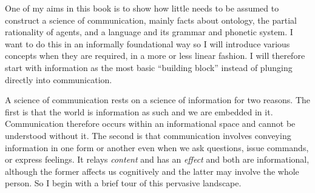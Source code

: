 One of my aims in this book is to show how little needs to be assumed to construct a science of communication, mainly facts about ontology, the partial rationality of agents, and a language and its grammar and phonetic system. I want to do this in an informally foundational way so I will introduce various concepts when they are required, in a more or less linear fashion. I will therefore start with information as the most basic ``building block'' instead of plunging directly into communication. 

A science of communication rests on a science of information for two reasons. The first is that the world is information as such and we are embedded in it. Communication therefore occurs within an informational space and cannot be understood without it. The second is that communication involves conveying information in one form or another even when we ask questions, issue commands, or express feelings. It relays \emph{content} and has an \emph{effect} and both are informational, although the former affects us cognitively and the latter may involve the whole person. So I begin with a brief tour of this pervasive landscape.
